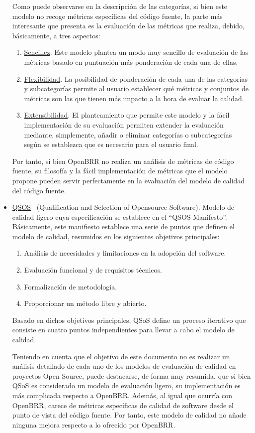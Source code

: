 \documentclass[11pt]{article}
\begin{document}
\begin{itemize}
Como puede observarse en la descripción de las categorías, si bien este modelo no recoge métricas específicas del código fuente, la parte más interesante que presenta es la evaluación de las métricas que realiza, debido, básicamente, a tres aspectos:
\begin{enumerate}
\item{\underline{Sencillez}}. Este modelo plantea un modo muy sencillo de evaluación de las métricas basado en puntuación más ponderación de cada una de ellas.
\item{\underline{Flexibilidad}}. La posibilidad de ponderación de cada una de las categorías y subcategorías permite al usuario establecer qué métricas y conjuntos de métricas son las que tienen más impacto a la hora de evaluar la calidad.
\item{\underline{Extensibilidad}}. El planteamiento que permite este modelo y la fácil implementación de su evaluación permiten extender la evaluación mediante, simplemente, añadir o eliminar categorías o subcategorías según se establezca que es necesario para el usuario final.
\end{enumerate}

Por tanto, si bien OpenBRR no realiza un análisis de métricas de código fuente, su filosofía y la fácil implementación de métricas que el modelo propone pueden servir perfectamente en la evaluación del modelo de calidad del código fuente.

\item{\underline{QSOS}~\cite{qsos:qsos} (Qualification and Selection of Opensource Software)}. Modelo de calidad ligero cuya especificación se establece en el ``QSOS Manifesto''. Básicamente, este manifiesto establece una serie de puntos que definen el modelo de calidad, resumidos en los siguientes objetivos principales:
\begin{enumerate}
\item{Análisis de necesidades y limitaciones en la adopción del software}.
\item{Evaluación funcional y de requisitos técnicos}.
\item{Formalización de metodología}.
\item{Proporcionar un método libre y abierto}.
\end{enumerate}
Basado en dichos objetivos principales, QSoS define un proceso iterativo que consiste en cuatro puntos independientes para llevar a cabo el modelo de calidad.

Teniendo en cuenta que el objetivo de este documento no es realizar un análisis detallado de cada uno de los modelos de evaluación de calidad en proyectos Open Source, puede destacarse, de forma muy resumida, que si bien QSoS es considerado un modelo de evaluación ligero, su implementación es más complicada respecto a OpenBRR. Además, al igual que ocurría con OpenBRR, carece de métricas específicas de calidad de software desde el punto de vista del código fuente. Por tanto, este modelo de calidad no añade ninguna mejora respecto a lo ofrecido por OpenBRR.
\end{itemize}
\end{document}
